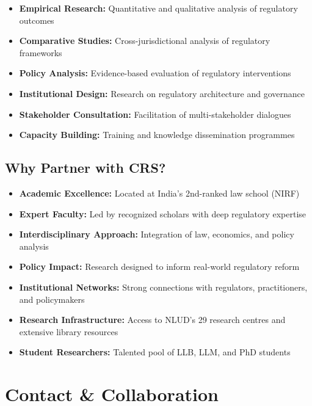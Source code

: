 \documentclass[11pt,a4paper]{article}
\begin{document}
\begin{itemize}[leftmargin=*,itemsep=0.2cm]
    \item \textbf{Empirical Research:} Quantitative and qualitative analysis of regulatory outcomes
    \item \textbf{Comparative Studies:} Cross-jurisdictional analysis of regulatory frameworks
    \item \textbf{Policy Analysis:} Evidence-based evaluation of regulatory interventions
    \item \textbf{Institutional Design:} Research on regulatory architecture and governance
    \item \textbf{Stakeholder Consultation:} Facilitation of multi-stakeholder dialogues
    \item \textbf{Capacity Building:} Training and knowledge dissemination programmes
\end{itemize}

\vspace{0.5cm}

\subsection*{Why Partner with CRS?}

\begin{itemize}[leftmargin=*,itemsep=0.3cm]
    \item \textbf{Academic Excellence:} Located at India's 2nd-ranked law school (NIRF)
    \item \textbf{Expert Faculty:} Led by recognized scholars with deep regulatory expertise
    \item \textbf{Interdisciplinary Approach:} Integration of law, economics, and policy analysis
    \item \textbf{Policy Impact:} Research designed to inform real-world regulatory reform
    \item \textbf{Institutional Networks:} Strong connections with regulators, practitioners, and policymakers
    \item \textbf{Research Infrastructure:} Access to NLUD's 29 research centres and extensive library resources
    \item \textbf{Student Researchers:} Talented pool of LLB, LLM, and PhD students
\end{itemize}

\clearpage

\section{Contact \& Collaboration}
\end{document}
